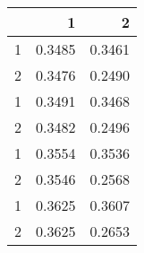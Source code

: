 \begin{tabular}{lrr}
\toprule
{} &       1 &       2 \\
\midrule
1 &  0.3485 &  0.3461 \\
2 &  0.3476 &  0.2490 \\
1 &  0.3491 &  0.3468 \\
2 &  0.3482 &  0.2496 \\
1 &  0.3554 &  0.3536 \\
2 &  0.3546 &  0.2568 \\
1 &  0.3625 &  0.3607 \\
2 &  0.3625 &  0.2653 \\
\bottomrule
\end{tabular}
